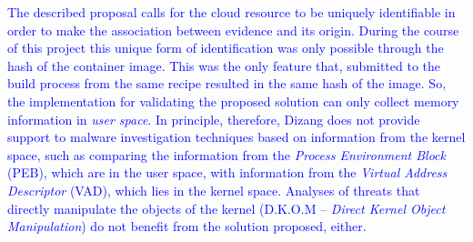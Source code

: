 \documentclass[conference]{IEEEtran}
\newcommand{\fancyname}{Dizang }
\begin{document}
\textcolor{blue}{The described proposal calls for the cloud resource to be uniquely identifiable in order to make the association between evidence and its origin.
%
During the course of this project this unique form of identification was only possible through the hash of the container image. This was the only feature that, submitted to the build process from the same recipe resulted in the same hash of the image.
%
So, the implementation for validating the proposed solution can only collect memory information in \textit{user space}.
%
In principle, therefore, \fancyname does not provide support to malware investigation techniques based on information from the kernel space, such as comparing the information from the \textit{Process Environment Block} (PEB), which are in the user space, with information from the \textit{Virtual Address Descriptor} (VAD), which lies in the kernel space. 
%
Analyses of threats that directly manipulate the objects of the kernel (D.K.O.M – \textit{Direct Kernel Object Manipulation}) do not benefit from the solution proposed, either.}


%
%

\end{document}
